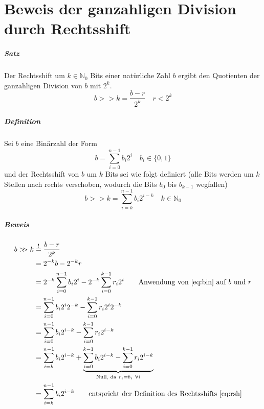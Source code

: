 \chapter{Beweis der ganzahligen Division durch Rechtsshift}
\label{proof-division}
\writtenby{\dcauthornameewie}%
\paragraph{Satz}
Der Rechtsshift um $k\in\mathbb{N}_0$ Bits einer natürliche Zahl $b$ ergibt den Quotienten der ganzahligen Division von $b$ mit $2^k$.
\begin{equation}
  b >\!\!> k = \frac{b-r}{2^k} \quad r < 2^k
\end{equation}

\paragraph{Definition}
Sei $b$ eine Binärzahl der Form
\begin{equation}
  \label{eq:bin}
  b = \sum_{i=0}^{n-1} b_i 2^i \quad b_i \in \{0,1\}
\end{equation}
und der Rechtsshift von $b$ um $k$ Bits sei wie folgt definiert (alle Bits werden um $k$ Stellen nach rechts verschoben, wodurch die Bits $b_0$ bis $b_{k-1}$ wegfallen)
\begin{equation}
  \label{eq:rsh}
  b >\!\!> k = \sum_{i=k}^{n-1} b_i 2^{i-k} \quad k \in \mathbb{N}_0
\end{equation}

\paragraph{Beweis}
\begin{align*}
  b >\!\!> k &\overset{!}{=} \frac{b-r}{2^k}  \\
    &= 2^{-k} b - 2^{-k} r \\
    &= 2^{-k} \sum_{i=0}^{n-1} b_i 2^i - 2^{-k} \sum_{i=0}^{k-1} r_i 2^i
      \tag*{Anwendung von \eqref{eq:bin} auf $b$ und $r$} \\
    &= \sum_{i=0}^{n-1} b_i 2^i 2^{-k} - \sum_{i=0}^{k-1} r_i 2^i 2^{-k} \\
    &= \sum_{i=0}^{n-1} b_i 2^{i-k} - \sum_{i=0}^{k-1} r_i 2^{i-k} \\
    &= \sum_{i=k}^{n-1} b_i 2^{i-k} + \underbrace{\sum_{i=0}^{k-1} b_i 2^{i-k} - \sum_{i=0}^{k-1} r_i 2^{i-k}}_{\text{Null, da}~r_i=b_i~\forall i} \\
    &= \sum_{i=k}^{n-1} b_i 2^{i-k}
      \tag*{entspricht der Definition des Rechtsshifts \eqref{eq:rsh}}
\end{align*}
\hfill \qedsymbol
